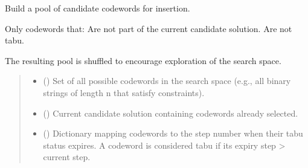 \documentclass[letterpaper,10pt,english]{sphinxmanual}
\begin{document}

\begin{fulllineitems}
\label{\detokenize{index:hammindist.functions.build_outside_pool}}
\pysigstartsignatures
\pysiglinewithargsret
{}
{\sphinxparamcomma {}\sphinxparamcomma {}\sphinxparamcomma {}}
{}
\pysigstopsignatures
\sphinxAtStartPar
Build a pool of candidate codewords for insertion.

\sphinxAtStartPar
Only codewords that:
\sphinxhyphen{} Are not part of the current candidate solution.
\sphinxhyphen{} Are not tabu.

\sphinxAtStartPar
The resulting pool is shuffled to encourage exploration
of the search space.
\begin{quote}\begin{description}
\begin{itemize}
\item {} 
\sphinxAtStartPar
{} (\sphinxstyleliteralemphasis{\sphinxupquote{{[}}}\sphinxstyleliteralemphasis{\sphinxupquote{{]}}}) \textendash{} Set of all possible codewords in the
search space (e.g., all binary strings
of length n that satisfy constraints).

\item {} 
\sphinxAtStartPar
{} (\sphinxstyleliteralemphasis{\sphinxupquote{{[}}}\sphinxstyleliteralemphasis{\sphinxupquote{{]}}}) \textendash{} Current candidate solution containing
codewords already selected.

\item {} 
\sphinxAtStartPar
{} (\sphinxstyleliteralemphasis{\sphinxupquote{{[}}}\sphinxstyleliteralemphasis{\sphinxupquote{, }}\sphinxstyleliteralemphasis{\sphinxupquote{{]}}}) \textendash{} Dictionary mapping codewords to the
step number when their tabu status
expires. A codeword is considered
tabu if its expiry step \textgreater{} current step.


\end{itemize}
\end{description}
\end{quote}
\end{fulllineitems}
\end{document}
